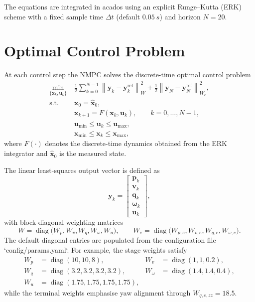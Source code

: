 \documentclass[11pt,a4paper]{article}
\begin{document}
The equations are integrated in acados using an explicit Runge--Kutta (ERK) scheme with a fixed sample time $\Delta t$ (default $\SI{0.05}{s}$) and horizon $N=20$.

\section{Optimal Control Problem}

At each control step the NMPC solves the discrete-time optimal control problem
\begin{align}
    \min_{\{\bm{x}_k,\bm{u}_k\}}\; & \frac{1}{2} \sum_{k=0}^{N-1} \left\| \bm{y}_k - \bm{y}_k^{\text{ref}} \right\|_{W}^2 
    + \frac{1}{2} \left\| \bm{y}_N - \bm{y}_N^{\text{ref}} \right\|_{W_e}^2, \\
    \text{s.t.}\; & \bm{x}_0 = \hat{\bm{x}}_0, \\
    & \bm{x}_{k+1} = F(\bm{x}_k, \bm{u}_k), \qquad k = 0,\dots,N-1, \\
    & \bm{u}_{\min} \le \bm{u}_k \le \bm{u}_{\max}, \\
    & \bm{x}_{\min} \le \bm{x}_k \le \bm{x}_{\max},
\end{align}
where $F(\cdot)$ denotes the discrete-time dynamics obtained from the ERK integrator and $\hat{\bm{x}}_0$ is the measured state.

The linear least-squares output vector is defined as
\begin{equation}
    \bm{y}_k = \begin{bmatrix} \bm{p}_k \\ \bm{v}_k \\ \bm{q}_k \\ \bm{\omega}_k \\ \bm{u}_k \end{bmatrix},
\end{equation}
with block-diagonal weighting matrices
\begin{equation}
    W = \operatorname{diag}\big( W_p, W_v, W_q, W_\omega, W_u \big), \qquad
    W_e = \operatorname{diag}\big( W_{p,e}, W_{v,e}, W_{q,e}, W_{\omega,e} \big).
\end{equation}
The default diagonal entries are populated from the configuration file `config/params.yaml`. For example, the stage weights satisfy
\begin{align}
    W_p &= \operatorname{diag}(10, 10, 8), & W_v &= \operatorname{diag}(1, 1, 0.2), \\
    W_q &= \operatorname{diag}(3.2, 3.2, 3.2, 3.2), & W_\omega &= \operatorname{diag}(1.4, 1.4, 0.4), \\
    W_u &= \operatorname{diag}(1.75, 1.75, 1.75, 1.75),
\end{align}
while the terminal weights emphasise yaw alignment through $W_{q,e,zz} = 18.5$.
\end{document}
